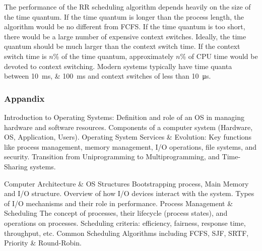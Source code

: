 The performance of the RR scheduling algorithm depends heavily on the size of the time quantum.
If the time quantum is longer than the process length, the algorithm would be no different from FCFS\@.
If the time quantum is too short, there would be a large number of expensive context switches.
Ideally, the time quantum should be much larger than the context switch time.
If the context switch time is \( n \)\si{\percent} of the time quantum, approximately \( n \)\si{\percent} of CPU time would be devoted to context switching.
Modern systems typically have time quanta between \SIlist{10;100}{\milli\second} and context switches of less than \SI{10}{\micro\second}.


\subsubsection{Appandix}
Introduction to Operating Systems:
Definition and role of an OS in managing hardware and software resources.
Components of a computer system (Hardware, OS, Application, Users).
Operating System Services \& Evolution:
Key functions like process management, memory management, I/O operations, file systems, and security.
Transition from Uniprogramming to Multiprogramming, and Time-Sharing systems.

Computer Architecture \& OS Structures
Bootstrapping process, Main Memory and I/O structure.
Overview of how I/O devices interact with the system.
Types of I/O mechanisms and their role in performance.
Process Management \& Scheduling
The concept of processes, their lifecycle (process states), and operations on processes.
Scheduling criteria: efficiency, fairness, response time, throughput, etc.
Common Scheduling Algorithms including FCFS, SJF, SRTF, Priority \& Round-Robin.